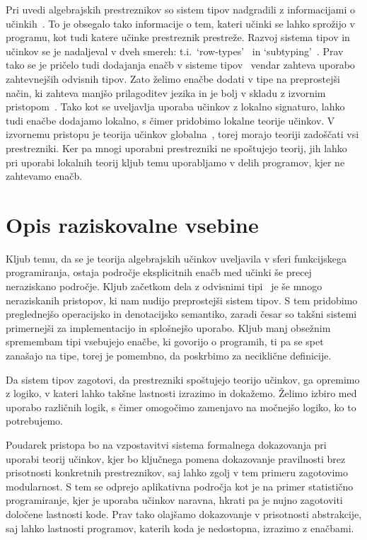 \documentclass{article}
\begin{document}
Pri uvedi algebrajskih prestreznikov so sistem tipov nadgradili z informacijami o učinkih~\cite{DBLP:conf/esop/PlotkinP09}. To je obsegalo tako informacije o tem, kateri učinki se lahko sprožijo v programu, kot tudi katere učinke prestreznik prestreže. Razvoj sistema tipov in učinkov se je nadaljeval v dveh smereh: t.i.\ `row-types'~\cite{DBLP:conf/icfp/HillerstromL16} in `subtyping'~\cite{DBLP:conf/esop/SalehKPS18}. Prav tako se je pričelo tudi dodajanja enačb v sisteme tipov~\cite{DBLP:journals/pacmpl/Ahman18} vendar zahteva uporabo zahtevnejših odvisnih tipov. Zato želimo enačbe dodati v tipe na preprostejši način, ki zahteva manjšo prilagoditev jezika in je bolj v skladu z izvornim pristopom~\cite{DBLP:phd/ethos/Pretnar10}. Tako kot se uveljavlja uporaba učinkov z lokalno signaturo, lahko tudi enačbe dodajamo lokalno, s čimer pridobimo lokalne teorije učinkov. V izvornemu pristopu je teorija učinkov globalna~\cite{DBLP:conf/esop/PlotkinP09}, torej morajo teoriji zadoščati vsi prestrezniki. Ker pa mnogi uporabni prestrezniki ne spoštujejo teorij, jih lahko pri uporabi lokalnih teorij kljub temu uporabljamo v delih programov, kjer ne zahtevamo enačb.

\section*{Opis raziskovalne vsebine}

Kljub temu, da se je teorija algebrajskih učinkov uveljavila v sferi funkcijskega programiranja, ostaja področje eksplicitnih enačb med učinki še precej neraziskano področje. Kljub začetkom dela z odvisnimi tipi~\cite{DBLP:journals/pacmpl/Ahman18} je še mnogo neraziskanih pristopov, ki nam nudijo preprostejši sistem tipov. S tem pridobimo preglednejšo operacijsko in denotacijsko semantiko, zaradi česar so takšni sistemi primernejši za implementacijo in splošnejšo uporabo. Kljub manj obsežnim spremembam tipi vsebujejo enačbe, ki govorijo o programih, ti pa se spet zanašajo na tipe, torej je pomembno, da poskrbimo za neciklične definicije. 

Da sistem tipov zagotovi, da prestrezniki spoštujejo teorijo učinkov, ga opremimo z logiko, v kateri lahko takšne lastnosti izrazimo in dokažemo. Želimo izbiro med uporabo različnih logik, s čimer omogočimo zamenjavo na močnejšo logiko, ko to potrebujemo.

Poudarek pristopa bo na vzpostavitvi sistema formalnega dokazovanja pri uporabi teorij učinkov, kjer bo ključnega pomena dokazovanje pravilnosti brez prisotnosti konkretnih prestreznikov, saj lahko zgolj v tem primeru zagotovimo modularnost. S tem se odprejo aplikativna področja kot je na primer statistično programiranje, kjer je uporaba učinkov naravna, hkrati pa je nujno zagotoviti določene lastnosti kode. Prav tako olajšamo dokazovanje v prisotnosti abstrakcije, saj lahko lastnosti programov, katerih koda je nedostopna, izrazimo z enačbami.
\end{document}
